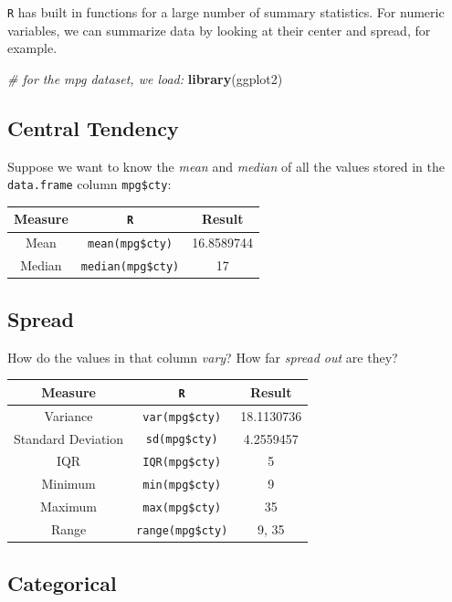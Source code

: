 \documentclass[]{book}
\newenvironment{Shaded}{\begin{snugshade}}{\end{snugshade}}
\newcommand{\KeywordTok}[1]{\textcolor[rgb]{0.13,0.29,0.53}{\textbf{#1}}}
\newcommand{\CommentTok}[1]{\textcolor[rgb]{0.56,0.35,0.01}{\textit{#1}}}
\newcommand{\NormalTok}[1]{#1}
\theoremstyle{definition}
\theoremstyle{definition}
\theoremstyle{definition}
\theoremstyle{remark}
\begin{document}
\texttt{R} has built in functions for a large number of summary
statistics. For numeric variables, we can summarize data by looking at
their center and spread, for example.

\begin{Shaded}
\begin{Highlighting}[]
\CommentTok{# for the mpg dataset, we load:}
\KeywordTok{library}\NormalTok{(ggplot2)}
\end{Highlighting}
\end{Shaded}

\subsection*{Central Tendency}\label{central-tendency}

Suppose we want to know the \emph{mean} and \emph{median} of all the
values stored in the \texttt{data.frame} column \texttt{mpg\$cty}:

\begin{longtable}[]{@{}ccc@{}}
\toprule
Measure & \texttt{R} & Result\tabularnewline
\midrule
\endhead
Mean & \texttt{mean(mpg\$cty)} & 16.8589744\tabularnewline
Median & \texttt{median(mpg\$cty)} & 17\tabularnewline
\bottomrule
\end{longtable}

\subsection*{Spread}\label{spread}

How do the values in that column \emph{vary}? How far \emph{spread out}
are they?

\begin{longtable}[]{@{}ccc@{}}
\toprule
Measure & \texttt{R} & Result\tabularnewline
\midrule
\endhead
Variance & \texttt{var(mpg\$cty)} & 18.1130736\tabularnewline
Standard Deviation & \texttt{sd(mpg\$cty)} & 4.2559457\tabularnewline
IQR & \texttt{IQR(mpg\$cty)} & 5\tabularnewline
Minimum & \texttt{min(mpg\$cty)} & 9\tabularnewline
Maximum & \texttt{max(mpg\$cty)} & 35\tabularnewline
Range & \texttt{range(mpg\$cty)} & 9, 35\tabularnewline
\bottomrule
\end{longtable}

\subsection*{Categorical}\label{categorical}
\end{document}
